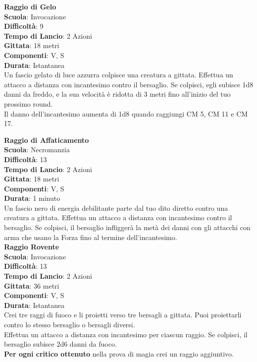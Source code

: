 \begin{multicols}{2}
\medskip\textbf{Raggio di Gelo}\\
\textbf{Scuola}: Invocazione\\
\textbf{Difficoltà}: 9\\
\textbf{Tempo di Lancio}: 2 Azioni\\
\textbf{Gittata}: 18 metri\\
\textbf{Componenti}: V, S\\
\textbf{Durata}: Istantanea\\
Un fascio gelato di luce azzurra colpisce una creatura a gittata. Effettua un attacco a distanza con incantesimo contro il bersaglio. Se colpisci, egli subisce 1d8 danni da freddo, e la sua velocità è ridotta di 3 metri fino all'inizio del tuo prossimo round. \\
Il danno dell'incantesimo aumenta di 1d8 quando raggiungi CM 5, CM 11 e CM 17.

\medskip\textbf{Raggio di Affaticamento}\\
\textbf{Scuola}: Necromanzia\\
\textbf{Difficoltà}: 13\\
\textbf{Tempo di Lancio}: 2 Azioni\\
\textbf{Gittata}: 18 metri\\
\textbf{Componenti}: V, S\\
\textbf{Durata}: 1 minuto\\
Un fascio nero di energia debilitante parte dal tuo dito diretto contro una creatura a gittata. Effettua un attacco a distanza con incantesimo contro il bersaglio. Se colpisci, il bersaglio infliggerà la metà dei danni con gli attacchi con arma che usano la Forza fino al termine dell'incantesimo.\\ 

\medskip\textbf{Raggio Rovente}\\
\textbf{Scuola}: Invocazione\\
\textbf{Difficoltà}: 13\\
\textbf{Tempo di Lancio}: 2 Azioni\\
\textbf{Gittata}: 36 metri\\
\textbf{Componenti}: V, S\\
\textbf{Durata}: Istantanea\\
Crei tre raggi di fuoco e li proietti verso tre bersagli a gittata. Puoi proiettarli contro lo stesso bersaglio o bersagli diversi.\\
Effettua un attacco a distanza con incantesimo per ciascun raggio. Se colpisci, il bersaglio subisce 2d6 danni da fuoco.\\
\textbf{Per ogni critico ottenuto} nella prova di magia crei un raggio aggiuntivo.


\end{multicols}
